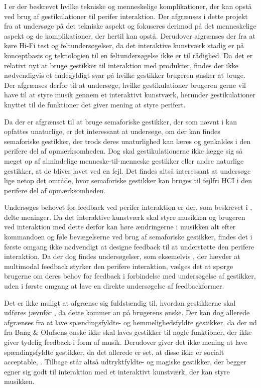 I  er der beskrevet hvilke tekniske og menneskelige komplikationer, der kan opstå ved brug af gestikulationer til perifer interaktion. Der afgrænses i dette projekt fra at undersøge på det tekniske aspekt og fokuseres derimod på det menneskelige aspekt og de komplikationer, der hertil kan opstå. Derudover afgrænses der fra at køre Hi-Fi test og feltundersøgelser, da det interaktive kunstværk stadig er på konceptbasis og teknologien til en feltundersøgelse ikke er til rådighed. Da det er relativt nyt at bruge gestikker til interaktion med produkter, findes der ikke nødvendigvis et endegyldigt svar på hvilke gestikker brugeren ønsker at bruge. Der afgrænses derfor til at undersøge, hvilke gestikulationer brugeren gerne vil have til at styre musik gennem et interaktivt kunstværk, herunder gestikulationer knyttet til de funktioner det giver mening at styre perifert. 

Da der er afgrænset til at bruge semaforiske gestikker, der som nævnt i  kan opfattes unaturlige, er det interessant at undersøge, om der kan findes semaforiske gestikker, der trods deres unaturlighed kan læres og genkaldes i den perifere del af opmærksomheden. Dog skal gestikulationerne ikke lægge sig så meget op af almindelige menneske-til-menneske gestikker eller andre naturlige gestikker, at de bliver lavet ved en fejl. Det findes altså interessant at undersøge lige netop det område, hvor semaforiske gestikker kan bruges til fejlfri HCI i den perifere del af opmærksomheden. 

Undersøges behovet for feedback ved perifer interaktion er der, som beskrevet i , delte meninger. Da det interaktive kunstværk skal styre musikken og brugeren ved interaktion med dette derfor kan høre ændringerne i musikken alt efter kommandoen og føle bevægelserne ved brug af semaforiske gestikker, findes det i første omgang ikke nødvendigt at designe feedback til at understøtte den perifere interaktion. Da der dog findes undersøgelser, som eksemelvis \textcite[s. 21]{PDF:FacilitatingPIDesignAndEvaluation}, der hævder at multimodal feedback styrker den perifere interaktion, vælges det at spørge brugerne om deres behov for feedback i forbindelse med undersøgelse af gestikker, uden i første omgang at lave en direkte undersøgelse af feedbackformer. 

Det er ikke muligt at afgrænse sig fuldstændig til, hvordan gestikkerne skal udføres jævnfør , da dette kommer an på brugerens ønske. Der kan dog allerede afgrænses fra at lave spændingsfyldte- og hemmelighedsfyldte gestikker, da der ud fra Bang $\&$ Olufsens ønske ikke skal laves gestikker til nogle funktioner, der ikke giver tydelig feedback i form af musik. Derudover giver det ikke mening at lave spændingsfyldte gestikker, da det allerede er set, at disse ikke er socialt acceptable, \parencite{PDF:WouldYouDoThat}. Tilbage står altså udtryktfyldte- og magiske gestikker, der begger egner sig godt til interaktion med et interaktivt kunstværk, der kan styre musikken. 

